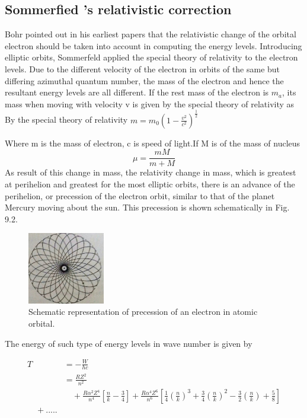 \documentclass[a4paper]{article}
\begin{document}
\subsection{Sommerfied 's relativistic correction }
Bohr pointed out in his earliest papers that the relativistic change of the orbital electron should be taken into account in computing the energy levels. Introducing elliptic orbits, Sommerfeld applied the special theory of relativity to the electron levels. Due to the different velocity of the electron in orbits of the same but differing azimuthal quantum number, the mass of the electron and hence the resultant energy levels are all different. If the rest mass of the electron is $m_a$, its mass when moving with velocity v is given by the special theory of relativity as
By the special theory of relativity $m = m_0 (1 -\frac{v^2}{c^2} )^\frac{1}{2}$

Where m is the mass of  electron, c is speed of light.If M is of the mass of nucleus $$\mu=\frac {mM}{m+M}$$
As result of this change in mass, the relativity change in mass, which is greatest at perihelion and  greatest for the most elliptic orbits, there is an advance of the perihelion, or precession of the electron orbit, similar  to that of the planet Mercury moving about the sun. This precession is shown schematically in Fig. 9.2.

\begin{figure}
\centering
\includegraphics[width=0.3\textwidth]{Relativistic_orbit.jpg}
\caption{\label{fig:frog} Schematic representation of precession of an electron in atomic orbital.}
\end{figure}

The energy of such type of energy levels in wave number is given by 

\begin{equation}
\begin{split}
T & = - \frac { W } { h c }   \\
  & = \frac { R Z ^ { 2 } } { n ^ { 2 } } \\
  &\quad + \frac { R \alpha ^ { 2 } Z ^ { 4 } } { n ^ { 4 } } \left[ \frac { n } { k } - \frac { 3 } { 4 } \right] + \frac { R \alpha ^ { 4 } Z ^ { 6 } } { n ^ { 6 } }\left[ \frac { 1 } { 4 } \left( \frac { n } { k } \right) ^ { 3 }  + \frac { 3 } { 4 } \left( \frac { n } { k } \right) ^ { 2 } - \frac { 3 } { 2 } \left( \frac { n } { k } \right) + \frac { 5 } { 8 } \right] \\
  \quad + .....
\label{eq:sn}
\end{split}
\end{equation}
\end{document}
